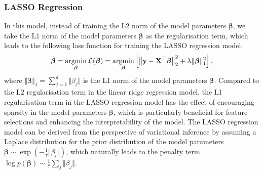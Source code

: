 \subsubsection{LASSO Regression}\label{appendix:lasso_regression}
In this model, instead of training the L2 norm of the model parameters $\boldsymbol{\beta}$, we take the L1 norm of the model parameters $\boldsymbol{\beta}$ as the regularisation term, which leads to the following loss function for training the LASSO regression model:
\begin{equation}    \label{eq:lasso_loss}
    \hat{\boldsymbol{\beta}} = \operatorname*{argmin}_{\boldsymbol{\beta}} \mathcal{L}(\boldsymbol{\beta}) = \operatorname*{argmin}_{\boldsymbol{\beta}} \left[\left\Vert \mathbf{y}-\mathbf{X}^\top\boldsymbol{\beta}\right\Vert_2^2 + \lambda\Vert\boldsymbol{\beta}\Vert_1^2 \right],       
\end{equation}
where $\Vert\boldsymbol{\beta}\Vert_1=$$\sum_{j=1}^{d} \Vert \beta_j\Vert$ is the L1 norm of the model parameters $\boldsymbol{\beta}$. Compared to the L2 regularisation term in the linear ridge regression model, the L1 regularisation term in the LASSO regression model has the effect of encouraging sparsity in the model parameters $\boldsymbol{\beta}$, which is particularly beneficial for feature selections and enhancing the interpretability of the model. The LASSO regression model can be derived from the perspective of variational inference by assuming a Laplace distribution for the prior distribution of the model parameters $\boldsymbol{\beta}\sim\exp\left(-\frac{1}{\tau}\Vert\beta_i\Vert\right)$, which naturally leads to the penalty term $\log p(\boldsymbol{\beta})\sim\frac{1}{\tau}\sum_j \Vert\beta_j\Vert$.

